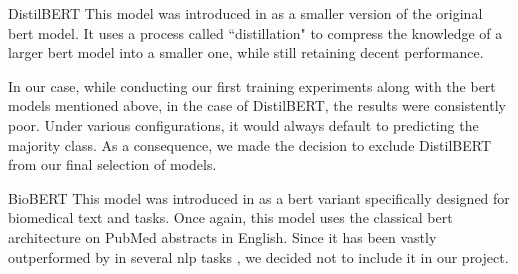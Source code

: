 \begin{paragraph}{DistilBERT}
    This model was introduced in
     as a smaller version of the original \gls{bert} model. It uses a process called ``distillation" to compress the knowledge of a larger \gls{bert} model into a smaller one, while still retaining decent performance. 

    In our case, while conducting our first training experiments along with the \gls{bert} models mentioned above, in the case of DistilBERT, the results were consistently poor. Under various configurations, it would always default to predicting the majority class. As a consequence, we made the decision to exclude DistilBERT from our final selection of models.
\end{paragraph}


\begin{paragraph}{BioBERT}
    This model was introduced in  as a \gls{bert} variant specifically designed for biomedical text and tasks. Once again, this model uses the classical \gls{bert} architecture on PubMed abstracts in English. Since it has been vastly outperformed by \bertbiolinkbert{} in several \gls{nlp} tasks , we decided not to include it in our project.
\end{paragraph}


